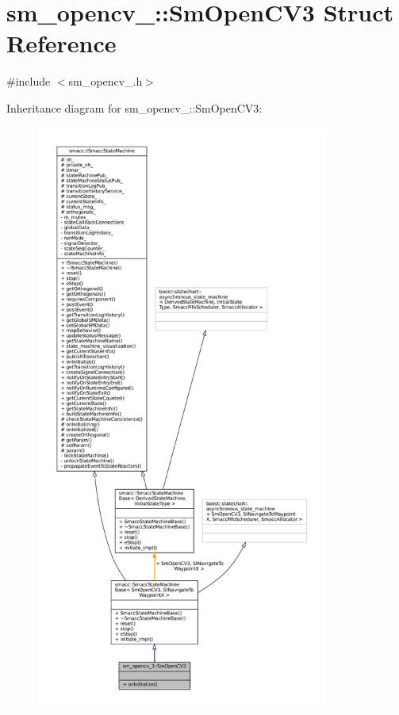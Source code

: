 \hypertarget{structsm__opencv__3_1_1SmOpenCV3}{}\section{sm\+\_\+opencv\+\_\+:\+:Sm\+Open\+C\+V3 Struct Reference}
\label{structsm__opencv__3_1_1SmOpenCV3}


{\ttfamily \#include $<$sm\+\_\+opencv\+\_.\+h$>$}



Inheritance diagram for sm\+\_\+opencv\+\_\+:\+:Sm\+Open\+C\+V3\+:
\nopagebreak
\begin{figure}[H]
\begin{center}
\leavevmode
\includegraphics[height=550pt]{structsm__opencv__3_1_1SmOpenCV3__inherit__graph}
\end{center}
\end{figure}


